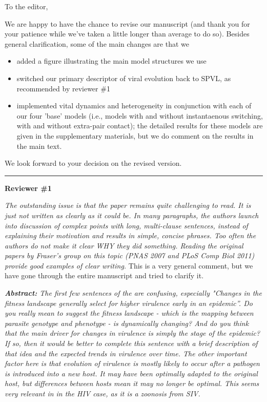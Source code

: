 \documentclass[10pt]{letter}
\newcommand{\revcomment}[1]{\emph{#1}}
\newcommand{\response}[1]{#1}
\begin{document}
\date{\today}

\signature{\texttt{[image: bbsig3.png]}\\Benjamin Bolker}

\begin{letter}{
} 

\opening{To the editor,}

We are happy to have the chance to revise our manuscript
(and thank you for your patience while we've taken a little
longer than average to do so). Besides general clarification,
some of the main changes are that we
\begin{itemize}
  \item added a figure illustrating the main model structures we use
  \item switched our primary descriptor of viral evolution back to SPVL, as recommended by reviewer \#1
  \item implemented vital dynamics and heterogeneity in conjunction
with each of our four 'base' models (i.e., models with and 
without instantaenous switching, with and without extra-pair contact); 
the detailed results for these models are given in the supplementary materials, but
we do comment on the results in the main text.
\end{itemize}

We look forward to your decision on the revised version.

\vskip10pt
\hrule

\textbf{Reviewer \#1}

\revcomment{
The outstanding issue is that the paper remains quite challenging to
read. It is just not written as clearly as it could be. In many
paragraphs, the authors launch into discussion of complex points with
long, multi-clause sentences, instead of explaining their motivation
and results in simple, concise phrases. Too often the authors do not
make it clear WHY they did something. Reading the original papers by
Fraser’s group on this topic (PNAS 2007 and PLoS Comp Biol 2011)
provide good examples of clear writing.
}
\response{This is a very general comment, but we have gone
through the entire manuscript and tried to clarify it.}

\revcomment{
\textbf{Abstract:} The first few sentences of the are confusing,
especially "Changes in the fitness landscape generally select for
higher virulence early in an epidemic”. Do you really mean to suggest
the fitness landscape - which is the mapping between parasite genotype
and phenotype - is dynamically changing? And do you think that the
main driver for changes in virulence is simply the stage of the
epidemic? If so, then it would be better to complete this sentence
with a brief description of that idea and the expected trends in
virulence over time. The other important factor here is that evolution
of virulence is mostly likely to occur after a pathogen is introduced
into a new host. It may have been optimally adapted to the original
host, but differences between hosts mean it may no longer be
optimal. This seems very relevant in in the HIV case, as it is a
zoonosis from SIV.
}


\end{letter}
\end{document}

